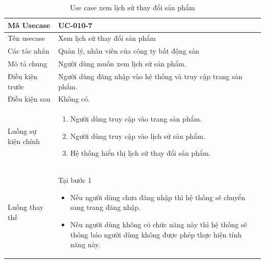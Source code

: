\documentclass[12pt,a4paper]{article}
\begin{document}
    \begin{table}[H]
        \centering
        \begin{tabular}{|p{3.5cm}|p{11.5cm}|c|}
            \hline
            Mã Usecase      & UC-010-7                                                      \\
            \hline
            Tên usecase     & Xem lịch sử thay đổi sản phẩm                                 \\
            \hline
            Các tác nhân    & Quản lý, nhân viên của công ty bất động sản                   \\
            \hline
            Mô tả chung     & Người dùng muốn xem lịch sử sản phẩm.                         \\
            \hline

            Điều kiện trước & Người dùng đăng nhập vào hệ thống và truy cập trang sản phẩm. \\
            \hline

            Điều kiện sau   & Không có.                                                     \\
            \hline

            Luồng sự kiện chính & \vspace{-.8cm}\begin{enumerate}
                                                    \item Người dùng truy cập vào trang sản phẩm.
                                                    \item Người dùng truy cập vào lịch sử sản phẩm.
                                                    \item Hệ thống hiển thị lịch sử thay đổi sản phẩm.
            \end{enumerate}
            \\
            \hline
            Luồng thay thế & Tại bước 1\newline
            \vspace{-.8cm}\begin{itemize}
                              \item Nếu người dùng chưa đăng nhập thì hệ thống sẽ chuyển sang trang đăng nhập.
                              \item Nếu người dùng không có chức năng này thì hệ thống sẽ thông báo người dùng không được phép thực hiện tính năng này.
            \end{itemize}
            \\ \hline
        \end{tabular}
        \caption{Use case xem lịch sử thay đổi sản phẩm}

    \end{table}
\end{document}
